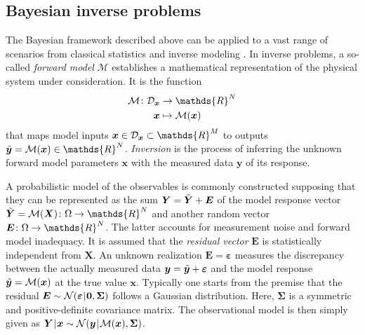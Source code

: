 \subsection{Bayesian inverse problems}
The Bayesian framework described above can be applied to a vast range of scenarios from classical statistics
\cite{Bayesian:Jackman2009,Bayesian:Gelman2014:3rd} and inverse modeling \cite{Bayesian:Stuart2010,Bayesian:Ernst2014}.
In inverse problems, a so-called \emph{forward model} \(\mathcal{M}\) establishes a mathematical representation of the physical system under consideration.
It is the function
\begin{equation} \label{eq:JCP:Bayesian:Inverse:ForwardModel}
  \begin{aligned}
    \mathcal{M} \colon \mathcal{D}_{\bm{x}} &\rightarrow \mathds{R}^\dimData \\
    \bm{x} &\mapsto \mathcal{M}(\bm{x})
  \end{aligned}
\end{equation}
that maps model inputs \(\bm{x} \in \mathcal{D}_{\bm{x}} \subset \mathds{R}^\dimParam\) to outputs \(\perfect{\bm{y}} = \mathcal{M}(\bm{x}) \in \mathds{R}^\dimData\).
\emph{Inversion} is the process of inferring the unknown forward model parameters \(\bm{x}\) with the measured data \(\bm{y}\) of its response.
\par %
A probabilistic model of the observables is commonly constructed supposing that they can be represented as the sum \(\bm{Y} = \tilde{\bm{Y}} + \bm{E}\)
of the model response vector \(\perfect{\bm{Y}} = \mathcal{M}(\bm{X}) \colon \Omega \rightarrow \mathds{R}^\dimData\) and another random vector \(\bm{E} \colon \Omega \rightarrow \mathds{R}^\dimData\).
The latter accounts for measurement noise and forward model inadequacy.
It is assumed that the \emph{residual vector} \(\bm{E}\) is statistically independent from \(\bm{X}\).
An unknown realization \(\bm{E} = \bm{\varepsilon}\) measures the discrepancy between the actually measured data
\(\bm{y} = \tilde{\bm{y}} + \bm{\varepsilon}\) and the model response \(\tilde{\bm{y}} = \mathcal{M}(\bm{x})\) at the true value \(\bm{x}\).
Typically one starts from the premise that the residual \(\bm{E} \sim \mathcal{N}(\bm{\varepsilon} {\:\!}|{\:\!} \bm{0},\bm{\Sigma})\) follows a Gaussian distribution.
Here, \(\bm{\Sigma}\) is a symmetric and positive-definite covariance matrix.
The observational model is then simply given as \(\bm{Y} {\:\!}|{\:\!} \bm{x} \sim \mathcal{N}(\bm{y} {\:\!}|{\:\!} \mathcal{M}(\bm{x}),\bm{\Sigma})\).
